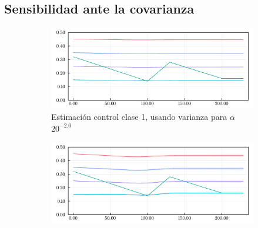 \subsection{Sensibilidad ante la covarianza} \label{subsec:sensicov}
\begin{figure}[H]
\centering
\begin{subfigure}[b]{0.47\textwidth}
     \centering
     \includegraphics[width=\textwidth]{img/resultados/synth/sensialphacov_alphacov0-003_0alphaini0-15_0-1_0-45_high1_b2real1-88_gereal0-1961_gireal0-1389_acov0-8_aini0-27675_gcov0-05gamma_e_0-1961_gamma_i_0-1389_beta_2_1-8800.pdf}
     \caption{Estimación control clase 1, usando varianza para \(\alpha\) \(20^{-2.0}\)}
     \label{fig:legend-sensi-acov-class1--a}
\end{subfigure} 
\hfill
\begin{subfigure}[b]{0.47\textwidth}
     \centering
     \includegraphics[width=\textwidth]{img/resultados/synth/sensialphacov_alphacov0-008_0alphaini0-15_0-1_0-45_high1_b2real1-88_gereal0-1961_gireal0-1389_acov0-8_aini0-27675_gcov0-05gamma_e_0-1961_gamma_i_0-1389_beta_2_1-8800.pdf}

\end{subfigure}
\end{figure}
